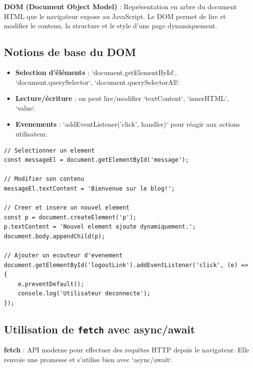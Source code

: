 \documentclass[a4paper,12pt]{book}
\begin{document}
\begin{definitionbox}
    \textbf{DOM (Document Object Model)} : Repr\'esentation en arbre du document HTML que le navigateur expose au JavaScript. Le DOM permet de lire et modifier le contenu, la structure et le style d'une page dynamiquement.
\end{definitionbox}

\subsection{Notions de base du DOM}

\begin{itemize}
    \item \textbf{Selection d'\'el\'ements} : `document.getElementById`, `document.querySelector`, `document.querySelectorAll`.
    \item \textbf{Lecture/\'ecriture} : on peut lire/modifier `textContent`, `innerHTML`, `value`.
    \item \textbf{Evenements} : `addEventListener('click', handler)` pour r\'eagir aux actions utilisateur.
\end{itemize}

\begin{lstlisting}[style=javascript,caption=Exemple DOM - selection et manipulation simple]
// Selectionner un element
const messageEl = document.getElementById('message');

// Modifier son contenu
messageEl.textContent = 'Bienvenue sur le blog!';

// Creer et insere un nouvel element
const p = document.createElement('p');
p.textContent = 'Nouvel element ajoute dynamiquement.';
document.body.appendChild(p);

// Ajouter un ecouteur d'evenement
document.getElementById('logoutLink').addEventListener('click', (e) => {
    e.preventDefault();
    console.log('Utilisateur deconnecte');
});
\end{lstlisting}

\subsection{Utilisation de \texttt{fetch} avec async/await}

\begin{definitionbox}
    \textbf{fetch} : API moderne pour effectuer des requ\^etes HTTP depuis le navigateur. Elle renvoie une promesse et s'utilise bien avec `async/await`.
\end{definitionbox}
\end{document}
